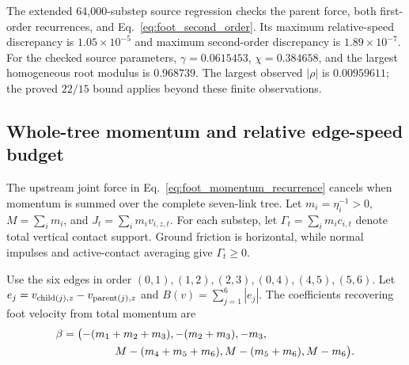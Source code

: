 The extended 64,000-substep source regression checks the parent force, both first-order recurrences, and Eq.~\eqref{eq:foot_second_order}.
Its maximum relative-speed discrepancy is $1.05\times10^{-5}$ and maximum second-order discrepancy is $1.89\times10^{-7}$.
For the checked source parameters, $\gamma=0.0615453$, $\chi=0.384658$, and the largest homogeneous root modulus is $0.968739$.
The largest observed $|\rho|$ is $0.00959611$; the proved $22/15$ bound applies beyond these finite observations.

\subsection{Whole-tree momentum and relative edge-speed budget}
\label{app:global_momentum}

The upstream joint force in Eq.~\eqref{eq:foot_momentum_recurrence} cancels when momentum is summed over the complete seven-link tree.
Let $m_i=\eta_i^{-1}>0$, $M=\sum_i m_i$, and $J_t=\sum_i m_i v_{i,z,t}$.
For each substep, let $\Gamma_t=\sum_i m_i c_{i,t}$ denote total vertical contact support.
Ground friction is horizontal, while normal impulses and active-contact averaging give $\Gamma_t\ge0$.

Use the six edges in order $(0,1),(1,2),(2,3),(0,4),(4,5),(5,6)$.
Let $e_j=v_{{\rm child}(j),z}-v_{{\rm parent}(j),z}$ and $B(v)=\sum_{j=1}^6|e_j|$.
The coefficients recovering foot velocity from total momentum are
\begin{align}
 \beta={}&\bigl(-(m_1+m_2+m_3),-(m_2+m_3),-m_3,\nonumber\\
 &\hspace{12mm}M-(m_4+m_5+m_6),M-(m_5+m_6),M-m_6\bigr).
\end{align}

